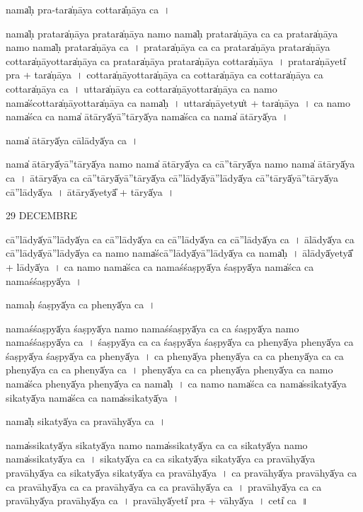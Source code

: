 \documentclass[parskip, DIV=14]{scrartcl}
\begin{document}
{nama̍ḥ pra॒-tara̍ṇāya co॒ttara̎ṇāya ca॒~।

nama̍ḥ pra॒tara̍ṇāya pra॒tara̍ṇāya॒ namo॒ nama̍ḥ pra॒tara̍ṇāya ca ca pra॒tara̍ṇāya॒ namo॒ nama̍ḥ pra॒tara̍ṇāya ca~।
pra॒tara̍ṇāya ca ca pra॒tara̍ṇāya pra॒tara̍ṇāya co॒ttara̍ṇāyo॒ttara̍ṇāya ca pra॒tara̍ṇāya pra॒tara̍ṇāya co॒ttara̍ṇāya~।
pra॒tara̍ṇā॒yeti̍ pra + tara̍ṇāya~।
co॒ttara̍ṇāyo॒ttara̍ṇāya ca co॒ttara̍ṇāya ca co॒ttara̍ṇāya ca co॒ttara̍ṇāya ca~।
u॒ttara̍ṇāya ca co॒ttara̍ṇāyo॒ttara̍ṇāya ca॒ namo॒ nama̍śco॒ttara̍ṇāyo॒ttara̍ṇāya ca॒ nama̍ḥ~।
u॒ttara̍ṇā॒yetyu̍t + tara̍ṇāya~।
ca॒ namo॒ nama̍śca ca॒ nama̍ ātā॒ryā̍yā''tā॒ryā̍ya॒ nama̍śca ca॒ nama̍ ātā॒ryā̍ya~।

nama̍ ātā॒ryā̍ya cālā॒dyā̍ya ca॒~।

nama̍ ātā॒ryā̍yā''tā॒ryā̍ya॒ namo॒ nama̍ ātā॒ryā̍ya ca cā''tā॒ryā̍ya॒ namo॒ nama̍ ātā॒ryā̍ya ca~।
ā॒tā॒ryā̍ya ca cā''tā॒ryā̍yā''tā॒ryā̍ya cā''lā॒dyā̍yā''lā॒dyā̍ya cā''tā॒ryā̍yā''tā॒ryā̍ya cā''lā॒dyā̍ya~।
ā॒tā॒ryā̍yetyā̎ + tā॒ryā̍ya~।

29 DECEMBRE

cā॒''lā॒dyā̍yā''lā॒dyā̍ya ca  cā''lā॒dyā̍ya ca cā''lā॒dyā̍ya ca cā''lā॒dyā̍ya ca~। %
ā॒lā॒dyā̍ya ca cā''lā॒dyā̍yā''lā॒dyā̍ya ca॒ namo॒ nama̍ścā''lā॒dyā̍yā''lā॒dyā̍ya ca॒ nama̍ḥ~।
ā॒lā॒dyā̍yetyā̎ + lā॒dyā̍ya~।
ca॒ namo॒ nama̍śca ca॒ nama॒śśaṣpyā̍ya॒ śaṣpyā̍ya॒ nama̍śca ca॒ nama॒śśaṣpyā̍ya~।

nama॒ḥ śaṣpyā̍ya ca॒ phenyā̍ya ca॒~।

nama॒śśaṣpyā̍ya॒ śaṣpyā̍ya॒ namo॒ nama॒śśaṣpyā̍ya ca ca॒ śaṣpyā̍ya॒ namo॒ nama॒śśaṣpyā̍ya ca~।
śaṣpyā̍ya ca ca॒ śaṣpyā̍ya॒ śaṣpyā̍ya ca॒ phenyā̍ya॒ phenyā̍ya ca॒ śaṣpyā̍ya॒ śaṣpyā̍ya ca॒ phenyā̍ya~।
ca॒ phenyā̍ya॒ phenyā̍ya ca ca॒ phenyā̍ya ca ca॒ phenyā̍ya ca ca॒ phenyā̍ya ca~।
phenyā̍ya ca ca॒ phenyā̍ya॒ phenyā̍ya ca॒ namo॒ nama̍śca॒ phenyā̍ya॒ phenyā̍ya ca॒ nama̍ḥ~।
ca॒ namo॒ nama̍śca ca॒ nama̍ssika॒tyā̍ya sika॒tyā̍ya॒ nama̍śca ca॒ nama̍ssika॒tyā̍ya~।

nama̍ḥ sika॒tyā̍ya ca pravā॒hyā̍ya ca~।

nama̍ssika॒tyā̍ya sika॒tyā̍ya॒ namo॒ nama̍ssika॒tyā̍ya ca ca sika॒tyā̍ya॒ namo॒ nama̍ssika॒tyā̍ya ca~।
si॒ka॒tyā̍ya ca ca sika॒tyā̍ya sika॒tyā̍ya ca pravā॒hyā̍ya pravā॒hyā̍ya ca sika॒tyā̍ya sika॒tyā̍ya ca pravā॒hyā̍ya~।
ca॒ pra॒vā॒hyā̍ya pravā॒hyā̍ya ca ca pravā॒hyā̍ya ca ca pravā॒hyā̍ya ca ca pravā॒hyā̍ya ca~।
pra॒vā॒hyā̍ya ca ca pravā॒hyā̍ya pravā॒hyā̍ya ca~।
pra॒vā॒hyā̍yeti̍ pra + vā॒hyā̍ya~।
ceti̍ ca~॥

}
\end{document}
